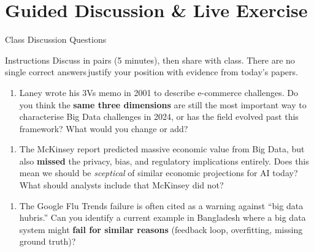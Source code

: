 \documentclass[aspectratio=169,10pt]{beamer}
\begin{document}
\section{Guided Discussion \& Live Exercise}

\begin{frame}{Class Discussion Questions}
  \begin{exampleblock}{Instructions}
    Discuss in pairs (5 minutes), then share with class.  There are no single correct answers\textemdash\,justify your position with evidence from today's papers.
  \end{exampleblock}
  \vspace{8pt}
  \begin{enumerate}[\textbf{D1.}]
    \item Laney wrote his 3Vs memo in 2001 to describe e-commerce challenges.  Do you think the \textbf{same three dimensions} are still the most important way to characterise Big Data challenges in 2024, or has the field evolved past this framework?  What would you change or add?
  \end{enumerate}
  \vspace{8pt}
  \begin{enumerate}[\textbf{D2.}]
    \item The McKinsey report predicted massive economic value from Big Data, but also \textbf{missed} the privacy, bias, and regulatory implications entirely.  Does this mean we should be \emph{sceptical} of similar economic projections for AI today?  What should analysts include that McKinsey did not?
  \end{enumerate}
  \vspace{8pt}
  \begin{enumerate}[\textbf{D3.}]
    \item The Google Flu Trends failure is often cited as a warning against ``big data hubris.''  Can you identify a current example in Bangladesh where a big data system might \textbf{fail for similar reasons} (feedback loop, overfitting, missing ground truth)?
  \end{enumerate}
\end{frame}
\end{document}
